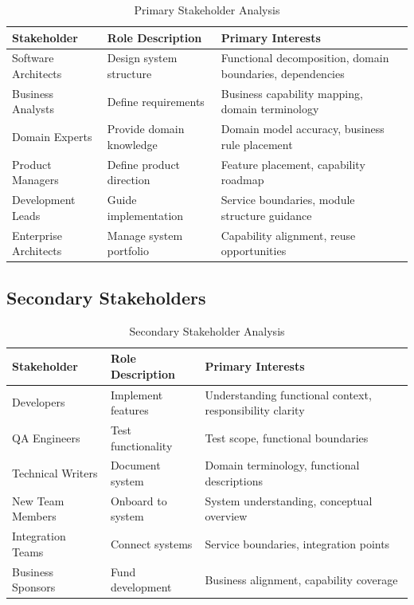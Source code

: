 \documentclass[11pt,letterpaper]{article}
\begin{document}
\begin{table}[H]
\centering
\caption{Primary Stakeholder Analysis}
\small
\begin{tabular}{@{}L{2.6cm}L{3.6cm}L{7cm}@{}}
\toprule
\textbf{Stakeholder} & \textbf{Role Description} & \textbf{Primary Interests} \\
\midrule
Software Architects & Design system structure & Functional decomposition, domain boundaries, dependencies \\
\addlinespace
Business Analysts & Define requirements & Business capability mapping, domain terminology \\
\addlinespace
Domain Experts & Provide domain knowledge & Domain model accuracy, business rule placement \\
\addlinespace
Product Managers & Define product direction & Feature placement, capability roadmap \\
\addlinespace
Development Leads & Guide implementation & Service boundaries, module structure guidance \\
\addlinespace
Enterprise Architects & Manage system portfolio & Capability alignment, reuse opportunities \\
\bottomrule
\end{tabular}
\end{table}

\subsection{Secondary Stakeholders}

\begin{table}[H]
\centering
\caption{Secondary Stakeholder Analysis}
\small
\begin{tabular}{@{}L{2.6cm}L{3.6cm}L{7cm}@{}}
\toprule
\textbf{Stakeholder} & \textbf{Role Description} & \textbf{Primary Interests} \\
\midrule
Developers & Implement features & Understanding functional context, responsibility clarity \\
\addlinespace
QA Engineers & Test functionality & Test scope, functional boundaries \\
\addlinespace
Technical Writers & Document system & Domain terminology, functional descriptions \\
\addlinespace
New Team Members & Onboard to system & System understanding, conceptual overview \\
\addlinespace
Integration Teams & Connect systems & Service boundaries, integration points \\
\addlinespace
Business Sponsors & Fund development & Business alignment, capability coverage \\
\bottomrule
\end{tabular}
\end{table}
\end{document}
